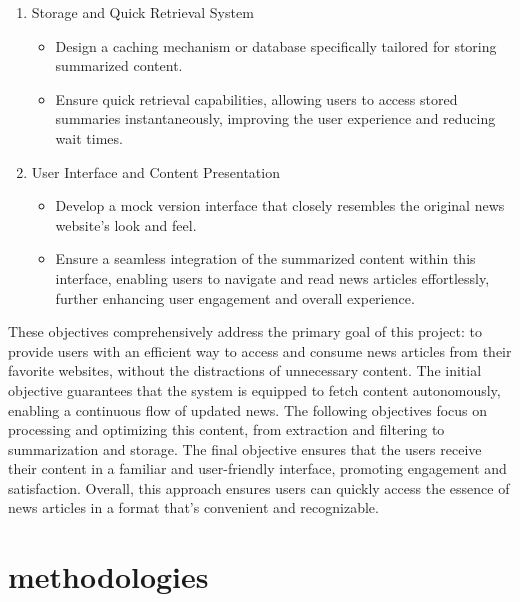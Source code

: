 \documentclass[a4paper]{article}
\begin{document}
\begin{enumerate}
    \item Storage and Quick Retrieval System
        \begin{itemize}
            \item Design a caching mechanism or database specifically tailored for storing summarized content.
            \item Ensure quick retrieval capabilities, allowing users to access stored summaries instantaneously, improving the user experience and reducing wait times.
        \end{itemize}
    \item User Interface and Content Presentation
        \begin{itemize}
            \item Develop a mock version interface that closely resembles the original news website's look and feel.
            \item Ensure a seamless integration of the summarized content within this interface, enabling users to navigate and read news articles effortlessly, further enhancing user engagement and overall experience.
        \end{itemize}
\end{enumerate}

\par These objectives comprehensively address the primary goal of this project: to provide users with an efficient way to access and consume news articles from their favorite websites, without the distractions of unnecessary content. The initial objective guarantees that the system is equipped to fetch content autonomously, enabling a continuous flow of updated news. The following objectives focus on processing and optimizing this content, from extraction and filtering to summarization and storage. The final objective ensures that the users receive their content in a familiar and user-friendly interface, promoting engagement and satisfaction. Overall, this approach ensures users can quickly access the essence of news articles in a format that's convenient and recognizable.

\section{methodologies}
\end{document}
